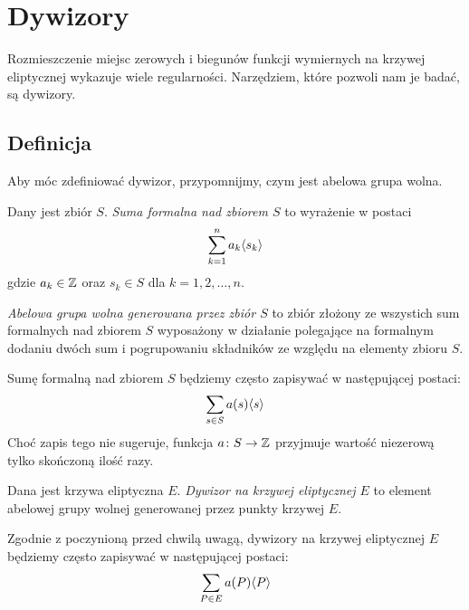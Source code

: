 \section{Dywizory}

Rozmieszczenie miejsc zerowych i biegunów
funkcji wymiernych na krzywej eliptycznej
wykazuje wiele regularności.
Narzędziem, które pozwoli nam je badać, są dywizory.

\subsection*{Definicja}

Aby móc zdefiniować dywizor,
przypomnijmy, czym jest abelowa grupa wolna.

\begin{definition}
Dany jest zbiór $S$.
\emph{Suma formalna nad zbiorem $S$} to wyrażenie w postaci
\begin{equation*}
\sum_{k=1}^n a_k\langle s_k\rangle
\end{equation*}
gdzie $a_k \in \mathbb{Z}$ oraz $s_k \in S$ dla $k = 1, 2, \ldots, n$.

\emph{Abelowa grupa wolna generowana przez zbiór $S$}
to zbiór złożony ze wszystich sum formalnych nad zbiorem $S$
wyposażony w działanie polegające na formalnym dodaniu dwóch sum
i pogrupowaniu składników ze względu na elementy zbioru $S$.
\end{definition}

\begin{remark}
Sumę formalną nad zbiorem $S$ będziemy często zapisywać
w następującej postaci:
\begin{equation*}
\sum_{s \in S}a(s)\langle s\rangle
\end{equation*}
Choć zapis tego nie sugeruje,
funkcja $a \colon S \to \mathbb{Z}$ przyjmuje wartość niezerową
tylko skończoną ilość razy.
\end{remark}

\begin{definition}
Dana jest krzywa eliptyczna $E$.
\emph{Dywizor na krzywej eliptycznej $E$}
to element abelowej grupy wolnej generowanej przez punkty krzywej $E$.
\end{definition}

\begin{remark}
Zgodnie z poczynioną przed chwilą uwagą,
dywizory na krzywej eliptycznej $E$ będziemy często zapisywać
w następującej postaci:
\begin{equation*}
\sum_{P \in E} a(P)\langle P\rangle
\end{equation*}
\end{remark}

